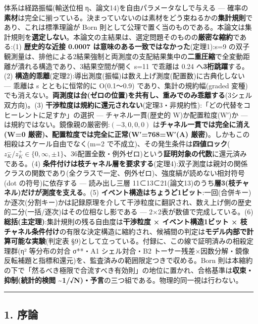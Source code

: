 \documentclass[
]{ltjsarticle}
\begin{document}
体系は経路振幅(輸送位相 η、論文14)を自由パラメータなしで与える ---
確率の\textbf{素材}は完全に揃っている。決まっていないのは素材をどう束ねるかの\textbf{集計規則}であり、これは標準理論が
Born
則として公理で置く当のものである。本論文は集計規則を\textbf{選定しない}。本論文の主結果は、選定問題そのものの\textbf{厳密な縮約}である:(1)
\textbf{歴史的な近接 0.0007 は意味のある一致ではなかった}(定理1):s=9
の双子観測量は、排他による2結果強制と両測度の支配結果集中の\textbf{二重圧縮}で全変動距離が潰れる構造であり、3結果空間が開く
s=11 で乖離は 0.24 へ\textbf{3桁跳躍}する。(2)
\textbf{構造的乖離}(定理2):導出測度(振幅)は数え上げ測度(配置数)に古典化しない
--- 乖離は s とともに恒常的に O(0.1〜0.9) であり、集計の規約幅(graded
変種)でも消えない。\textbf{両測度は台(ゼロの位置)を共有し、重みでのみ乖離する}(3シェル双方向)。(3)
\textbf{干渉粒度は規約に還元されない}(定理3・非規約性):「どの代替をコヒーレントに足すか」の選択
--- チャネル一貫(歴史的 W)か配置粒度(W′)か ---
は規約ではない。鏡像親の厳密例:\((-3,0,0,0)\)
は\textbf{チャネル一貫では完全に消え(W=0
厳密)、配置粒度では完全に正常(W′=768=W′(A)
厳密)}。しかもこの相殺はスケール自由でなく(m=2
で不成立)、その発生条件は\textbf{四値ロック}(\(z^-_K/z^+_K\in\{0,\infty,\pm1\}\)、36配置全数・例外ゼロ)という\textbf{証明対象の代数}に還元済みである。(4)
\textbf{条件付けは枝チャネル層を要求する}(定理4):双子測度は親対の関係クラスの関数であり(全クラスで一定、例外ゼロ)、強度縞が読めない相対符号(dot
の符号)に依存する --- 読み出し三層
11⊂13⊂21(論文13)のうち\textbf{層3(枝チャネル)だけが測度を支える}。(5)
\textbf{イベント構造はちょうど1ビット}:一回(合併キー)か逐次(分割キー)かは記録原理を介して干渉粒度に翻訳され、数え上げ側の歴史的二分(一括/逐次)はその位相なし影である
--- 2×2表が数値で完成している。(6)
\textbf{総括(主定理)}:集計規則の残る自由度は\textbf{干渉粒度 ×
イベント構造1ビット ×
枝チャネル条件付け}の有限な決定構造に縮約され、候補間の判定は\textbf{モデル内部で計算可能な実験}(判定表
§9)として立っている。付録に、この線で証明済みの相殺定理群(η²
等分布の対合 σ**・A1 シェル対合・B2
トーサー残差×因数分解・鏡像反転補題と指標和還元)を、監査済みの範囲限定つきで収める。Born
則は本縮約の下で「然るべき極限で合流すべき有効則」の地位に置かれ、合格基準は\textbf{収束・抑制(統計的検閲
\textasciitilde1/√N)・予言}の三つ組である。物理的同一視は行わない。

\begin{center}\rule{0.5\linewidth}{0.5pt}\end{center}

\subsection{1. 序論}\label{ux5e8fux8ad6}
\end{document}
